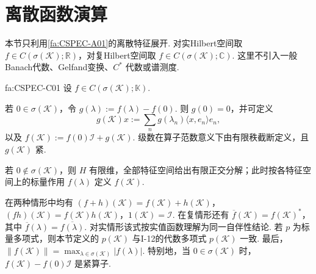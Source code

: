\section{离散函数演算}\label{sec:i14-discrete-calculus}

本节只利用\autoref{fa:CSPEC-A01}的离散特征展开. 对实Hilbert空间取 \(\displaystyle f\in C(\sigma(\mathcal K);\mathbb R)\)，对复Hilbert空间取 \(\displaystyle f\in C(\sigma(\mathcal K);\mathbb C)\). 这里不引入一般Banach代数、Gelfand变换、\(\displaystyle C^*\) 代数或谱测度.

\begin{FAProposition}[C][紧自伴离散函数演算工具]{fa:CSPEC-C01}
设 \(\displaystyle f\in C(\sigma(\mathcal K);\mathbb K)\).

若 \(\displaystyle0\in\sigma(\mathcal K)\)，令 \(\displaystyle g(\lambda):=f(\lambda)-f(0)\).
则 \(\displaystyle g(0)=0\)，并可定义
\[
g(\mathcal K)x
:=
\sum_n
g(\lambda_n)\langle x,e_n\rangle e_n,
\]
以及 \(\displaystyle f(\mathcal K):=f(0)\mathcal I+g(\mathcal K)\).
级数在算子范数意义下由有限秩截断定义，且 \(\displaystyle g(\mathcal K)\) 紧.

若 \(\displaystyle0\notin\sigma(\mathcal K)\)，则 \(\displaystyle H\) 有限维，全部特征空间给出有限正交分解；此时按各特征空间上的标量作用 \(\displaystyle f(\lambda)\) 定义 \(\displaystyle f(\mathcal K)\).

在两种情形中均有 \(\displaystyle (f+h)(\mathcal K)=f(\mathcal K)+h(\mathcal K)\)，\(\displaystyle (fh)(\mathcal K)=f(\mathcal K)h(\mathcal K)\)，\(\displaystyle 1(\mathcal K)=\mathcal I\).
在复情形还有 \(\displaystyle \overline f(\mathcal K)=f(\mathcal K)^*\)，
其中 \(\displaystyle \overline f(\lambda)=\overline{f(\lambda)}\). 对实情形该式按实值函数理解为同一自伴性结论. 若 \(\displaystyle p\) 为标量多项式，则本节定义的 \(\displaystyle p(\mathcal K)\) 与I-12的代数多项式 \(\displaystyle p(\mathcal K)\) 一致. 最后，
\(\displaystyle \|f(\mathcal K)\| = \max_{\lambda\in\sigma(\mathcal K)}|f(\lambda)|\).
特别地，当 \(\displaystyle0\in\sigma(\mathcal K)\) 时， \(\displaystyle f(\mathcal K)-f(0)\mathcal I\) 是紧算子.
\end{FAProposition}

